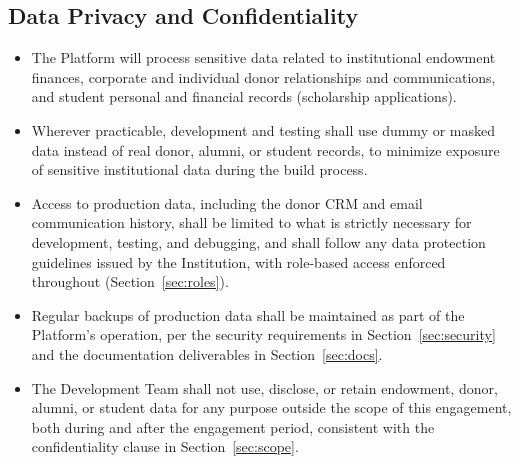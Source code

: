 \documentclass[11pt]{article}
\begin{document}
\subsection{Data Privacy and Confidentiality}
\begin{itemize}[leftmargin=1.4em, itemsep=3pt]
\item The Platform will process sensitive data related to institutional endowment finances, corporate and individual donor relationships and communications, and student personal and financial records (scholarship applications).
\item Wherever practicable, development and testing shall use dummy or masked data instead of real donor, alumni, or student records, to minimize exposure of sensitive institutional data during the build process.
\item Access to production data, including the donor CRM and email communication history, shall be limited to what is strictly necessary for development, testing, and debugging, and shall follow any data protection guidelines issued by the Institution, with role-based access enforced throughout (Section~\ref{sec:roles}).
\item Regular backups of production data shall be maintained as part of the Platform's operation, per the security requirements in Section~\ref{sec:security} and the documentation deliverables in Section~\ref{sec:docs}.
\item The Development Team shall not use, disclose, or retain endowment, donor, alumni, or student data for any purpose outside the scope of this engagement, both during and after the engagement period, consistent with the confidentiality clause in Section~\ref{sec:scope}.
\end{itemize}
\end{document}

